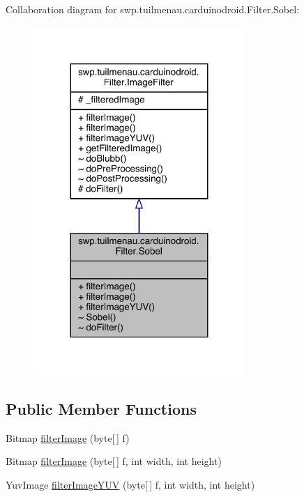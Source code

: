 Collaboration diagram for swp.\+tuilmenau.\+carduinodroid.\+Filter.\+Sobel\+:
\nopagebreak
\begin{figure}[H]
\begin{center}
\leavevmode
\includegraphics[width=227pt]{classswp_1_1tuilmenau_1_1carduinodroid_1_1_filter_1_1_sobel__coll__graph}
\end{center}
\end{figure}
\subsection*{Public Member Functions}
\begin{DoxyCompactItemize}
\item 
Bitmap \hyperlink{classswp_1_1tuilmenau_1_1carduinodroid_1_1_filter_1_1_sobel_ac5487d48e3b5bc2ee76f463ca088f31a}{filter\+Image} (byte\mbox{[}$\,$\mbox{]} f)
\item 
Bitmap \hyperlink{classswp_1_1tuilmenau_1_1carduinodroid_1_1_filter_1_1_sobel_ae7a8d5c6f0bd1b1e2db578bff09999c2}{filter\+Image} (byte\mbox{[}$\,$\mbox{]} f, int width, int height)
\item 
Yuv\+Image \hyperlink{classswp_1_1tuilmenau_1_1carduinodroid_1_1_filter_1_1_sobel_abdb3e40a11f50b00c36bbd817a9db5fd}{filter\+Image\+Y\+U\+V} (byte\mbox{[}$\,$\mbox{]} f, int width, int height)
\end{DoxyCompactItemize}
